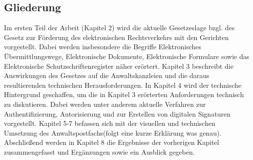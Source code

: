 \subsection{Gliederung}
Im ersten Teil der Arbeit (Kapitel 2) wird die aktuelle Gesetzeslage bzgl. des Gesetz zur Förderung des elektronischen Rechtsverkehrs mit den Gerichten vorgestellt. Dabei werden insbesondere die Begriffe  Elektronisches Übermittlungswege, Elektronische Dokumente, Elektronische Formulare sowie das Elektronische Schutzschriftenregister näher erörtert. Kapitel 3 beschreibt die Auswirkungen des Gesetzes auf die Anwaltskanzleien und die daraus resultierenden technischen Herausforderungen. In Kapitel 4 wird der technische Hintergrund geschaffen, um die in Kapitel 3 erörterten Anforderungen technisch zu diskutieren. Dabei werden unter anderem aktuelle Verfahren zur Authentifizierung, Autorisierung und zur Erstellen von digitalen Signaturen vorgestellt. Kapitel 5-7 befassen sich mit der visuellen und technischen Umsetzung des Anwaltspostfachs(folgt eine kurze Erklärung was genau).  Abschließend werden in Kapitel 8 die Ergebnisse der vorherigen Kapitel zusammengefasst und Ergänzungen sowie ein Ausblick gegeben. 



